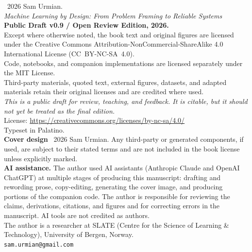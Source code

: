 \thispagestyle{empty}
\vspace*{\fill}
\noindent\small\raggedright
\textcopyright\ 2026 Sam Urmian.\\[2pt]
\noindent \emph{Machine Learning by Design: From Problem Framing to Reliable Systems}\\[2pt]
\noindent \textbf{Public Draft v0.9 / Open Review Edition, 2026.}\\[6pt]
\noindent Except where otherwise noted, the book text and original figures are licensed under the Creative Commons Attribution-NonCommercial-ShareAlike 4.0 International License (CC~BY-NC-SA~4.0).\\[4pt]
\noindent Code, notebooks, and companion implementations are licensed separately under the MIT License.\\[4pt]
\noindent Third-party materials, quoted text, external figures, datasets, and adapted materials retain their original licenses and are credited where used.\\[6pt]
\noindent \emph{This is a public draft for review, teaching, and feedback. It is citable, but it should not yet be treated as the final edition.}\\[6pt]
\noindent License: \url{https://creativecommons.org/licenses/by-nc-sa/4.0/}\\[6pt]
\noindent Typeset in Palatino.\\[6pt]
\noindent \textbf{Cover design} \textcopyright\ 2026 Sam Urmian. Any third-party or generated components, if used, are subject to their stated terms and are not included in the book license unless explicitly marked.\\[6pt]
\noindent \textbf{AI assistance.} The author used AI assistants (Anthropic Claude and OpenAI ChatGPT) at multiple stages of producing this manuscript: drafting and rewording prose, copy-editing, generating the cover image, and producing portions of the companion code. The author is responsible for reviewing the claims, derivations, citations, and figures and for correcting errors in the manuscript. AI tools are not credited as authors.\\[6pt]
\noindent The author is a researcher at SLATE (Centre for the Science of Learning \& Technology), University of Bergen, Norway.\\[6pt]
\noindent\texttt{sam.urmian@gmail.com}
\vspace{2em}
\clearpage
